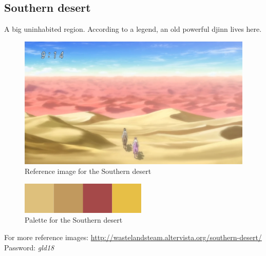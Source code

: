 \pagebreak

\subsection{Southern desert}
A big uninhabited region. According to a legend, an old powerful djinn lives here.
\begin{figure}[H]
  \centering
  \includegraphics[width=12cm]{../Images/Locations/southernDesert}
  \caption{Reference image for the Southern desert}
\end{figure}

\begin{figure}[H]
  \centering
  \includegraphics[width=6cm]{Images/Palettes/southernDesert}
  \caption{Palette for the Southern desert}
\end{figure}

For more reference images: \url{http://wastelandsteam.altervista.org/southern-desert/} \\
Password: \textit{gld18}

\pagebreak

